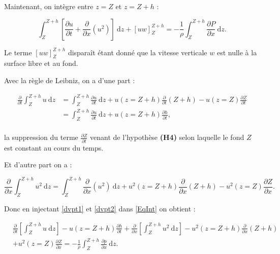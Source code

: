 \documentclass[
11pt, %
francais, %
singlespacing, %
headsepline, %
]{MastersDoctoralThesis} %
\theoremstyle{definition}
\begin{document}
Maintenant, on intègre entre $z=Z$ et $z=Z+h$ :

\begin{equation}
\int_{Z}^{Z+h}\left[\frac{\partial u}{\partial t}+\frac{\partial }{\partial x}(u^{2})\right]~\mathrm dz+\left[uw\right]_{Z}^{Z+h}=-\frac{1}{\rho}\int_{Z}^{Z+h}\frac{\partial P}{\partial x}~\mathrm dz. \label{EqInt}
\end{equation}

Le terme $\left[uw\right]_{Z}^{Z+h}$ disparaît étant donné que la vitesse verticale $w$ est nulle à la surface libre et au fond.

Avec la règle de Leibniz, on a d'une part :

\begin{equation}
\begin{split}
 \frac{\partial}{\partial t}\int_{Z}^{Z+h}u ~\mathrm dz & = \int_{Z}^{Z+h}\frac{\partial u}{\partial t} ~\mathrm dz +u(z=Z+h)\frac{\partial}{\partial t}(Z+h)-u(z=Z)\frac{\partial Z}{\partial t} \\
& = \int_{Z}^{Z+h}\frac{\partial u}{\partial t} ~\mathrm dz +u(z=Z+h)\frac{\partial h}{\partial t} ,\label{dvpt1}\\
\end{split}
\end{equation}

la suppression du terme $\frac{\partial Z}{\partial t}$ venant de l'hypothèse \textbf{(H4)} selon laquelle le fond $Z$ est constant au cours du temps.

Et d'autre part on a :

\begin{equation}
\frac{\partial}{\partial x}\int_{Z}^{Z+h}u^{2} ~\mathrm dz = \int_{Z}^{Z+h}\frac{\partial }{\partial x}(u^{2}) ~\mathrm dz +u^{2}(z=Z+h)\frac{\partial}{\partial x}(Z+h)-u^{2}(z=Z)\frac{\partial Z}{\partial x}. \label{dvpt2}
\end{equation}

Donc en injectant \eqref{dvpt1} et \eqref{dvpt2} dans \eqref{EqInt} on obtient :

\begin{equation}
\begin{split}
& \frac{\partial}{\partial t}\left[\int_{Z}^{Z+h}u ~\mathrm dz\right] -u(z=Z+h)\frac{\partial h}{\partial t} + \frac{\partial}{\partial x}\left[\int_{Z}^{Z+h} u^{2} ~\mathrm dz\right]-u^{2}(z=Z+h)\frac{\partial}{\partial x}(Z+h) \\
& +u^{2}(z=Z)\frac{\partial Z}{\partial x}= -\frac{1}{\rho}\int_{Z}^{Z+h}\frac{\partial p}{\partial x} ~\mathrm dz.
\end{split}
\end{equation}
\end{document}

